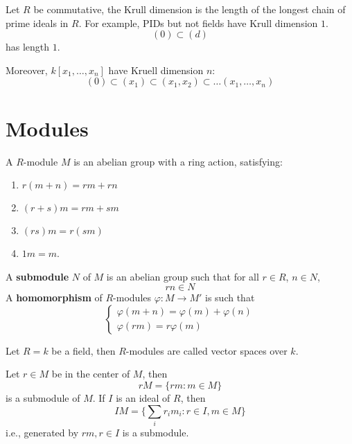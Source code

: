 \documentclass[openany]{book}
\begin{document}
\begin{defn}
    Let $R$ be commutative, the Krull dimension is the length of the longest chain of prime ideals in $R$. For example, PIDs but not fields have Krull dimension $1$. 
    \begin{equation*}
        (0)\subset (d)
    \end{equation*}
    has length $1$.

    Moreover, $k[x_1,\dots,x_n]$ have Kruell dimension $n$:
    \begin{equation*}
        (0)\subset (x_1)\subset(x_1,x_2)\subset\dots(x_1,\dots,x_n)
    \end{equation*}
\end{defn}


\section{Modules}
\begin{defn}[module]
    A $R$-module $M$ is an abelian group with a ring action, satisfying:
    \begin{enumerate}
        \item $r(m+n)=rm+rn$
        \item $(r+s)m=rm+sm$
        \item $(rs)m=r(sm)$
        \item $1m=m$.
    \end{enumerate}
    A \textbf{submodule} $N$ of $M$ is an abelian group such that for all $r\in R$, $n\in N$,
    \begin{equation*}
        rn\in N
    \end{equation*}
    A \textbf{homomorphism} of $R$-modules $\varphi: M\to M'$ is such that 
    \begin{equation*}
        \begin{cases}
            \varphi(m+n)=\varphi(m)+\varphi(n)\\
            \varphi(rm)=r\varphi(m)
        \end{cases}
    \end{equation*}
\end{defn}
Let $R=k$ be a field, then $R$-modules are called vector spaces over $k$.

\begin{defn}
    Let $r\in M$ be in the center of $M$, then 
    \begin{equation*}
        rM=\{rm: m\in M\}
    \end{equation*}
    is a submodule of $M$. If $I$ is an ideal of $R$, then 
    \begin{equation*}
        IM=\{\sum_ir_im_i: r\in I, m\in M\}
    \end{equation*}
    i.e., generated by $rm, r\in I$ is a submodule.
\end{defn}
\end{document}
